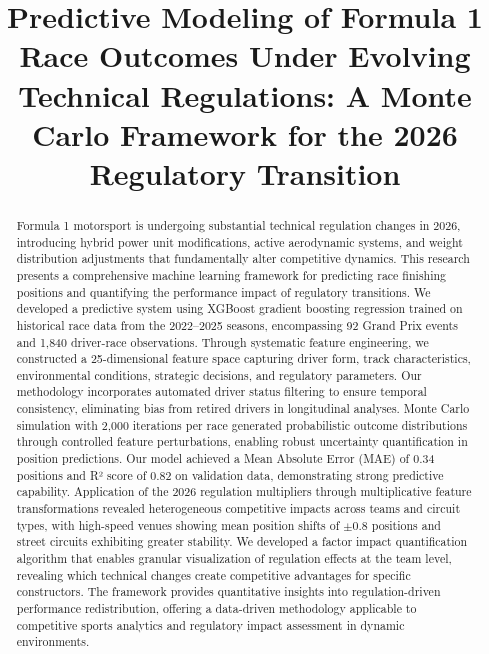 \documentclass[conference]{IEEEtran}
\begin{document}
\title{Predictive Modeling of Formula 1 Race Outcomes Under Evolving Technical Regulations: A Monte Carlo Framework for the 2026 Regulatory Transition}

\author{
}

\maketitle

\begin{abstract}
Formula 1 motorsport is undergoing substantial technical regulation changes in 2026, introducing hybrid power unit modifications, active aerodynamic systems, and weight distribution adjustments that fundamentally alter competitive dynamics. This research presents a comprehensive machine learning framework for predicting race finishing positions and quantifying the performance impact of regulatory transitions. We developed a predictive system using XGBoost gradient boosting regression trained on historical race data from the 2022--2025 seasons, encompassing 92 Grand Prix events and 1,840 driver-race observations. Through systematic feature engineering, we constructed a 25-dimensional feature space capturing driver form, track characteristics, environmental conditions, strategic decisions, and regulatory parameters. Our methodology incorporates automated driver status filtering to ensure temporal consistency, eliminating bias from retired drivers in longitudinal analyses. Monte Carlo simulation with 2,000 iterations per race generated probabilistic outcome distributions through controlled feature perturbations, enabling robust uncertainty quantification in position predictions. Our model achieved a Mean Absolute Error (MAE) of 0.34 positions and R² score of 0.82 on validation data, demonstrating strong predictive capability. Application of the 2026 regulation multipliers through multiplicative feature transformations revealed heterogeneous competitive impacts across teams and circuit types, with high-speed venues showing mean position shifts of $\pm$0.8 positions and street circuits exhibiting greater stability. We developed a factor impact quantification algorithm that enables granular visualization of regulation effects at the team level, revealing which technical changes create competitive advantages for specific constructors. The framework provides quantitative insights into regulation-driven performance redistribution, offering a data-driven methodology applicable to competitive sports analytics and regulatory impact assessment in dynamic environments.
\end{abstract}
\end{document}
